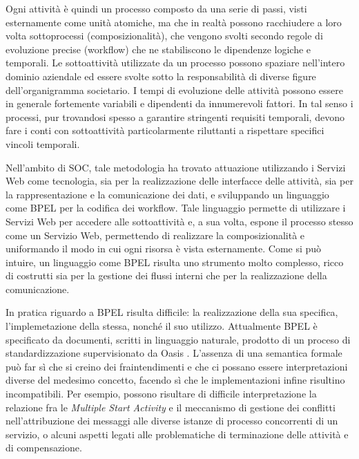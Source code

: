 Ogni attività è quindi un processo composto da una serie di passi, visti
esternamente come unità atomiche, ma che in realtà possono racchiudere a loro
volta sottoprocessi (composizionalità), che vengono svolti secondo regole di
evoluzione precise (workflow) che ne stabiliscono le dipendenze logiche e
temporali. Le sottoattività utilizzate da un processo possono spaziare
nell'intero dominio aziendale ed essere svolte sotto la responsabilità di diverse
figure dell'organigramma societario. I tempi di evoluzione delle attività possono
essere in generale fortemente variabili e dipendenti da innumerevoli fattori. In
tal senso i processi, pur trovandosi spesso a garantire stringenti requisiti
temporali, devono fare i conti con sottoattività particolarmente riluttanti a
rispettare specifici vincoli temporali.

Nell'ambito di SOC, tale metodologia ha trovato attuazione utilizzando i Servizi
Web come tecnologia, sia per la realizzazione delle interfacce delle
attività, sia per la rappresentazione e la comunicazione dei dati, e
sviluppando un linguaggio come BPEL \cite{BPEL11Spec} per la codifica dei workflow.
Tale linguaggio permette di utilizzare i Servizi Web per accedere alle
sottoattività e, a sua volta, espone il processo stesso come un Servizio Web,
permettendo di realizzare la composizionalità e uniformando il modo in cui ogni
risorsa è vista esternamente. Come si può intuire, un linguaggio come
BPEL risulta uno strumento molto complesso, ricco di costrutti sia per la gestione
dei flussi interni che per la realizzazione della comunicazione.

In pratica riguardo a BPEL risulta difficile: la realizzazione della sua
specifica, l'implemetazione della stessa, nonché il suo utilizzo. Attualmente
BPEL è specificato da documenti, scritti in linguaggio naturale, prodotto di un proceso
di standardizzazione supervisionato da Oasis \cite{OASISSite}. L'assenza di una
semantica formale può far sì che si creino dei fraintendimenti e che ci possano
essere interpretazioni diverse del medesimo concetto, facendo sì che le
implementazioni infine risultino incompatibili. Per esempio, possono risultare
di difficile interpretazione la relazione fra le \emph{Multiple Start Activity} e
il meccanismo di gestione dei conflitti nell'attribuzione dei messaggi alle
diverse istanze di processo concorrenti di un servizio, o alcuni aspetti legati
alle problematiche di terminazione delle attività e di compensazione.

